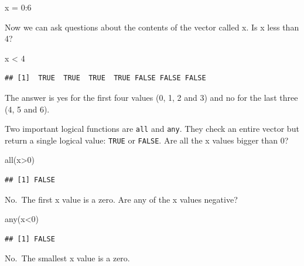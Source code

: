 \documentclass[
]{book}
\newenvironment{Shaded}{\begin{snugshade}}{\end{snugshade}}
\newcommand{\DecValTok}[1]{\textcolor[rgb]{0.00,0.00,0.81}{#1}}
\newcommand{\FunctionTok}[1]{\textcolor[rgb]{0.00,0.00,0.00}{#1}}
\newcommand{\NormalTok}[1]{#1}
\newcommand{\OtherTok}[1]{\textcolor[rgb]{0.56,0.35,0.01}{#1}}
\newcommand{\SpecialCharTok}[1]{\textcolor[rgb]{0.00,0.00,0.00}{#1}}
\theoremstyle{definition}
\theoremstyle{definition}
\theoremstyle{definition}
\theoremstyle{definition}
\theoremstyle{remark}
\begin{document}
\begin{Shaded}
\begin{Highlighting}[]
\NormalTok{x }\OtherTok{=} \DecValTok{0}\SpecialCharTok{:}\DecValTok{6}
\end{Highlighting}
\end{Shaded}

Now we can ask questions about the contents of the vector called x. Is x less than 4?

\begin{Shaded}
\begin{Highlighting}[]
\NormalTok{x }\SpecialCharTok{\textless{}} \DecValTok{4}
\end{Highlighting}
\end{Shaded}

\begin{verbatim}
## [1]  TRUE  TRUE  TRUE  TRUE FALSE FALSE FALSE
\end{verbatim}

The answer is yes for the first four values (0, 1, 2 and 3) and no for the last three (4, 5 and 6).

Two important logical functions are \texttt{all} and \texttt{any}. They check an entire vector but return a single logical value: \texttt{TRUE} or \texttt{FALSE}. Are all the x values bigger than 0?

\begin{Shaded}
\begin{Highlighting}[]
\FunctionTok{all}\NormalTok{(x}\SpecialCharTok{\textgreater{}}\DecValTok{0}\NormalTok{)}
\end{Highlighting}
\end{Shaded}

\begin{verbatim}
## [1] FALSE
\end{verbatim}

No.~The first x value is a zero. Are any of the x values negative?

\begin{Shaded}
\begin{Highlighting}[]
\FunctionTok{any}\NormalTok{(x}\SpecialCharTok{\textless{}}\DecValTok{0}\NormalTok{)}
\end{Highlighting}
\end{Shaded}

\begin{verbatim}
## [1] FALSE
\end{verbatim}

No.~The smallest x value is a zero.
\end{document}
